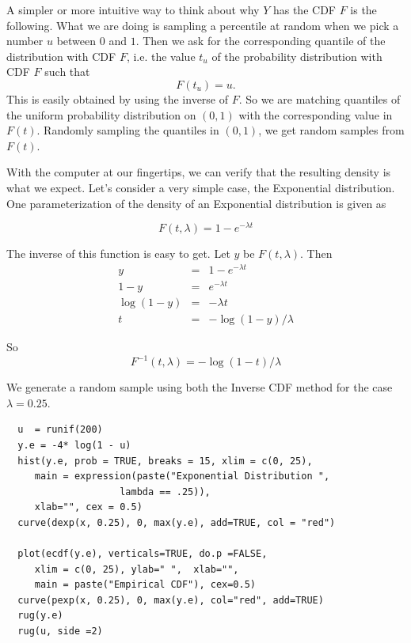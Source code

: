 A simpler or more intuitive way to think about why $Y$ has the CDF
$F$ is the following.  What we are doing is sampling a percentile
at random when we pick a number $u$ between $0$ and $1$.
Then we ask for the corresponding quantile of
the distribution with CDF $F$, i.e. the value $t_u$ of the probability 
distribution with CDF $F$ such that 
 $$F(t_u) = u.$$
This is easily obtained by using the inverse of $F$.  So we are
matching quantiles of the uniform probability distribution on $(0,1)$
with the corresponding value in $F(t)$.  Randomly sampling the
quantiles in $(0, 1)$, we get random samples from $F(t)$.


With the computer at our fingertips, we can verify that the resulting
density is what we expect.  Let's consider a very simple case, the
Exponential distribution.  One parameterization of the density of an
Exponential distribution is given as

$$ F(t, \lambda) = 1 - e^{-\lambda t}$$

The inverse of this function is easy to get.
Let $y$ be $F(t, \lambda)$.
Then 
\begin{eqnarray*}
  y &=& 1 - e^{-\lambda t} \\
  1-y &=& e^{-\lambda t} \\
  \log(1 - y) &=& -\lambda t\\
  t &=&  - \log(1 - y) / \lambda
\end{eqnarray*}

So 
$$ F^{-1}(t, \lambda) = - \log(1 - t)/ \lambda$$

We generate a random sample using both the Inverse CDF method for the case
$\lambda = 0.25$.
\begin{verbatim}
  u  = runif(200)
  y.e = -4* log(1 - u)
  hist(y.e, prob = TRUE, breaks = 15, xlim = c(0, 25),
     main = expression(paste("Exponential Distribution ", 
                    lambda == .25)),
     xlab="", cex = 0.5)
  curve(dexp(x, 0.25), 0, max(y.e), add=TRUE, col = "red")
  
  plot(ecdf(y.e), verticals=TRUE, do.p =FALSE,
     xlim = c(0, 25), ylab=" ",  xlab="",
     main = paste("Empirical CDF"), cex=0.5)
  curve(pexp(x, 0.25), 0, max(y.e), col="red", add=TRUE)
  rug(y.e)
  rug(u, side =2)
\end{verbatim}

